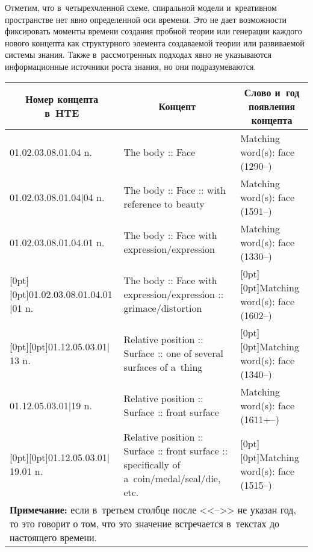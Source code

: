 \begin{multicols}{2}
  Отметим, что в~четырехчленной схеме, спиральной модели и~креативном 
пространстве нет явно определенной оси времени. Это не дает воз\-мож\-ности 
фиксировать моменты времени создания пробной теории или генерации 
каждого нового концепта как структурного элемента создаваемой теории или 
развиваемой сис\-те\-мы знания. Также в~рассмотренных подходах явно не 
указываются информационные источники роста знания, но они 
подразумеваются.



  \begin{table*}[b]\small %
  \begin{center}
  \vspace*{2ex}
  
  \begin{tabular}{|l|p{66mm}|l|}
  \hline
\multicolumn{1}{|c|}{Номер концепта 
в~HTE}&\multicolumn{1}{c|}{Концепт}&\multicolumn{1}{c|}{Слово и~год появления 
концепта}\\
\hline
01.02.03.08.01.04 n.&The body :: Face&Matching word(s): face (1290--)\\
\hline
01.02.03.08.01.04$\vert$04 n.&The body :: Face :: with reference to beauty&Matching word(s): 
face (1591--)\\
\hline
01.02.03.08.01.04.01 n.&The body :: Face with expression/expression&Matching word(s): face 
(1330--)\\
\hline
\multicolumn{1}{|l|}{\raisebox{-6pt}[0pt][0pt]{01.02.03.08.01.04.01$\vert$01 n.}}&The body :: Face with expression/expression :: 
grimace/distortion&\multicolumn{1}{l|}{\raisebox{-6pt}[0pt][0pt]{Matching word(s): face (1602--)}}\\
\hline
\multicolumn{1}{|l|}{\raisebox{-6pt}[0pt][0pt]{01.12.05.03.01$\vert$13 n.}}&Relative position :: Surface :: one of several surfaces of 
a~thing&\multicolumn{1}{l|}{\raisebox{-6pt}[0pt][0pt]{Matching word(s): face (1340--)}}\\
\hline
01.12.05.03.01$\vert$19 n.&Relative position :: Surface :: front surface&Matching word(s): face 
(1611\;+\;1820--)\\
\hline
\multicolumn{1}{|l|}{\raisebox{-6pt}[0pt][0pt]{01.12.05.03.01$\vert$19.01 n.}}&
Relative position :: Surface :: front surface :: specifically of 
a~coin/medal/seal/die, etc.&\multicolumn{1}{l|}{\raisebox{-6pt}[0pt][0pt]{Matching word(s): face (1515--)}}\\
\hline
\multicolumn{3}{p{162.5mm}}{\footnotesize \hspace*{3mm}\textbf{Примечание:}
если в~третьем столбце после <<-->> не указан год, то 
это говорит о том, что это значение встречается в~текстах до настоящего времени.}
   \end{tabular}
   \end{center}
   \end{table*}
   

\end{multicols}
